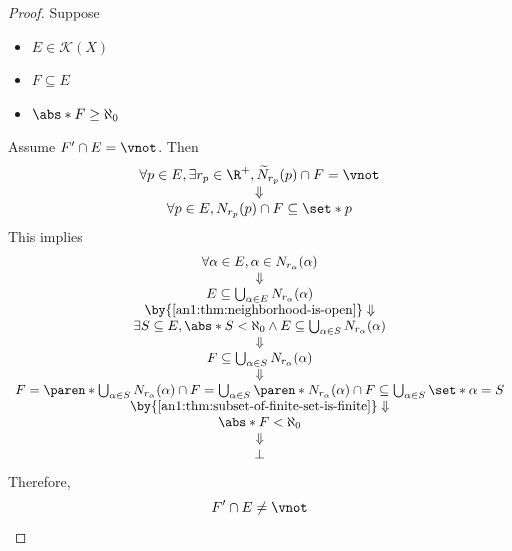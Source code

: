 \begin{proof}
  Suppose
  \begin{itemize}
    \item $E \in \mathcal{K}(X)$
    \item $F \subseteq E$
    \item $\abs*{F} \geq \aleph_{0}$
  \end{itemize}
  Assume $F' \cap E = \vnot$. Then
  \[
    \begin{array}{c}
      \forall p \in E, \exists r_{p} \in \R^{+}, \widetilde{N}_{r_{p}}(p) \cap F = \vnot \\
      \Downarrow                                                                         \\
      \forall p \in E, N_{r_{p}}(p) \cap F \subseteq \set*{p}
    \end{array}
  \]
  This implies
  \[
    \begin{array}{c}
      \forall \alpha \in E, \alpha \in N_{r_{\alpha}}(\alpha)                                                      \\
      \Downarrow                                                                                                   \\
      E \subseteq \bigcup_{\alpha \in E} N_{r_{\alpha}}(\alpha)                                                    \\
      \by{\Cref{an1:thm:neighborhood-is-open}} \Downarrow                                                          \\
      \exists S \subseteq E, \abs*{S} < \aleph_{0} \land E \subseteq \bigcup_{\alpha \in S} N_{r_{\alpha}}(\alpha) \\
      \Downarrow                                                                                                   \\
      F \subseteq \bigcup_{\alpha \in S} N_{r_{\alpha}}(\alpha)                                                    \\
      \Downarrow                                                                                                   \\
      F = \paren*{\bigcup_{\alpha \in S} N_{r_{\alpha}}(\alpha)} \cap F = \bigcup_{\alpha \in S}
      \paren*{N_{r_{\alpha}}(\alpha) \cap F} \subseteq \bigcup_{\alpha \in S} \set*{\alpha} = S                    \\
      \by{\Cref{an1:thm:subset-of-finite-set-is-finite}} \Downarrow                                                \\
      \abs*{F} < \aleph_{0}                                                                                        \\
      \Downarrow                                                                                                   \\
      \bot
    \end{array}
  \]
  Therefore,
  \[
    F' \cap E \neq \vnot
  \]
\end{proof}

